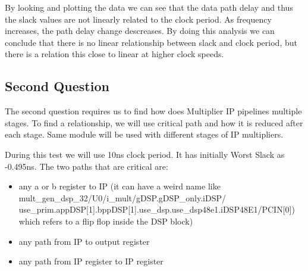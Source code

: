 \documentclass{report}
\begin{document}
By looking and plotting the data we can see that the data path delay and thus the slack values are not linearly related to the clock period.
As frequency increases, the path delay change descreases.
By doing this analysis we can conclude that there is no linear relationship between slack and clock period, but there is a relation this close to linear at higher clock speeds.

\subsection{Second Question}
The second question requires us to find how does Multiplier IP pipelines multiple stages.
To find a relationship, we will use critical path and how it is reduced after each stage. Same module will be used with different stages of IP multipliers.

During this test we will use 10ns clock period. It has initially Worst Slack as -0.495ns.
The two paths that are critical are:
\begin{itemize}
    \item any a or b register to IP (it can have a weird name like mult\_gen\_dsp\_32/U0/i\_mult/gDSP.gDSP\_only.iDSP/ use\_prim.appDSP[1].bppDSP[1].use\_dsp.use\_dsp48e1.iDSP48E1/PCIN[0]) which refers to a flip flop inside the DSP block)
    \item any path from IP to output register 
    \item any path from IP register to IP register
\end{itemize}
\end{document}
